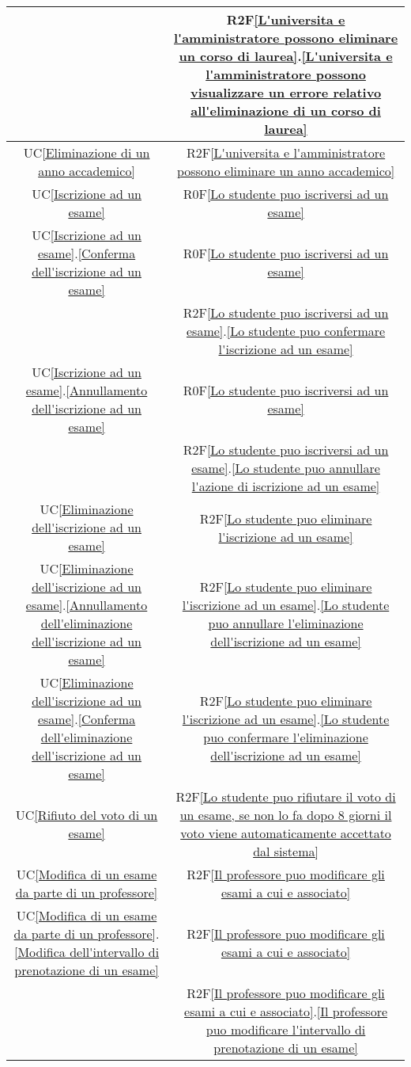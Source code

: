 \begin{longtable}{|c|c|}
& R2F\ref{L'universita e l'amministratore possono eliminare un corso di laurea}.\ref{L'universita e l'amministratore possono visualizzare un errore relativo all'eliminazione di un corso di laurea}\\
\hline
UC\ref{Eliminazione di un anno accademico} & R2F\ref{L'universita e l'amministratore possono eliminare un anno accademico}\\
\hline
UC\ref{Iscrizione ad un esame} & R0F\ref{Lo studente puo iscriversi ad un esame}\\
\hline
UC\ref{Iscrizione ad un esame}.\ref{Conferma dell'iscrizione ad un esame} & R0F\ref{Lo studente puo iscriversi ad un esame}\\
& R2F\ref{Lo studente puo iscriversi ad un esame}.\ref{Lo studente puo confermare l'iscrizione ad un esame}\\
\hline
UC\ref{Iscrizione ad un esame}.\ref{Annullamento dell'iscrizione ad un esame} & R0F\ref{Lo studente puo iscriversi ad un esame}\\
& R2F\ref{Lo studente puo iscriversi ad un esame}.\ref{Lo studente puo annullare l'azione di iscrizione ad un esame}\\
\hline
UC\ref{Eliminazione dell'iscrizione ad un esame} & R2F\ref{Lo studente puo eliminare l'iscrizione ad un esame}\\
\hline
UC\ref{Eliminazione dell'iscrizione ad un esame}.\ref{Annullamento dell'eliminazione dell'iscrizione ad un esame} & R2F\ref{Lo studente puo eliminare l'iscrizione ad un esame}.\ref{Lo studente puo annullare l'eliminazione dell'iscrizione ad un esame}\\
\hline
UC\ref{Eliminazione dell'iscrizione ad un esame}.\ref{Conferma dell'eliminazione dell'iscrizione ad un esame} & R2F\ref{Lo studente puo eliminare l'iscrizione ad un esame}.\ref{Lo studente puo confermare l'eliminazione dell'iscrizione ad un esame}\\
\hline
UC\ref{Rifiuto del voto di un esame} & R2F\ref{Lo studente puo rifiutare il voto di un esame, se non lo fa dopo 8 giorni il voto viene automaticamente accettato dal sistema}\\
\hline
UC\ref{Modifica di un esame da parte di un professore} & R2F\ref{Il professore puo modificare gli esami a cui e associato}\\
\hline
UC\ref{Modifica di un esame da parte di un professore}.\ref{Modifica dell'intervallo di prenotazione di un esame} & R2F\ref{Il professore puo modificare gli esami a cui e associato}\\
& R2F\ref{Il professore puo modificare gli esami a cui e associato}.\ref{Il professore puo modificare l'intervallo di prenotazione di un esame}\\

\end{longtable}
